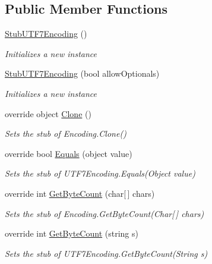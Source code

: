 \subsection*{Public Member Functions}
\begin{DoxyCompactItemize}
\item 
\hyperlink{class_system_1_1_text_1_1_fakes_1_1_stub_u_t_f7_encoding_a51952e1ebb1b95343716bf694b9468df}{Stub\-U\-T\-F7\-Encoding} ()
\begin{DoxyCompactList}\small\item\em Initializes a new instance\end{DoxyCompactList}\item 
\hyperlink{class_system_1_1_text_1_1_fakes_1_1_stub_u_t_f7_encoding_ae93c530955aee11c64f5d52b02a44bd3}{Stub\-U\-T\-F7\-Encoding} (bool allow\-Optionals)
\begin{DoxyCompactList}\small\item\em Initializes a new instance\end{DoxyCompactList}\item 
override object \hyperlink{class_system_1_1_text_1_1_fakes_1_1_stub_u_t_f7_encoding_a3ab02149078f70e0f73474ba6fc02d86}{Clone} ()
\begin{DoxyCompactList}\small\item\em Sets the stub of Encoding.\-Clone()\end{DoxyCompactList}\item 
override bool \hyperlink{class_system_1_1_text_1_1_fakes_1_1_stub_u_t_f7_encoding_a49571ea414be0277c9860a9dd206fee9}{Equals} (object value)
\begin{DoxyCompactList}\small\item\em Sets the stub of U\-T\-F7\-Encoding.\-Equals(\-Object value)\end{DoxyCompactList}\item 
override int \hyperlink{class_system_1_1_text_1_1_fakes_1_1_stub_u_t_f7_encoding_a7fb1d5b3c5609fb42f3af232f0f77fbf}{Get\-Byte\-Count} (char\mbox{[}$\,$\mbox{]} chars)
\begin{DoxyCompactList}\small\item\em Sets the stub of Encoding.\-Get\-Byte\-Count(\-Char\mbox{[}$\,$\mbox{]} chars)\end{DoxyCompactList}\item 
override int \hyperlink{class_system_1_1_text_1_1_fakes_1_1_stub_u_t_f7_encoding_ae812b41adeae870716be685512d23491}{Get\-Byte\-Count} (string s)
\begin{DoxyCompactList}\small\item\em Sets the stub of U\-T\-F7\-Encoding.\-Get\-Byte\-Count(\-String s)\end{DoxyCompactList}\item 

\end{DoxyCompactItemize}
